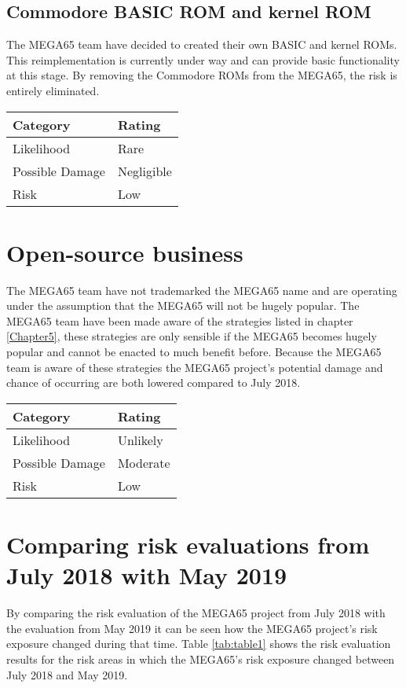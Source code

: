 \subsection{Commodore BASIC ROM and kernel ROM}
The MEGA65 team have decided to created their own BASIC and kernel ROMs. This reimplementation is currently under way and can provide basic functionality at this stage. By removing the Commodore ROMs from the MEGA65, the risk is entirely eliminated. \\

\begin{tabular}{l|l} %
    	\textbf{Category} 	&	\textbf{Rating} \\
      \hline
     Likelihood			&	Rare \\
     Possible Damage 	& 	Negligible \\
     Risk 				&	Low		\\	
    \end{tabular}


\section{Open-source business}
The MEGA65 team have not trademarked the MEGA65 name and are operating under the assumption that the MEGA65 will not be hugely popular. The MEGA65 team have been made aware of the strategies listed in chapter \ref{Chapter5}, these strategies are only sensible if the MEGA65 becomes hugely popular and cannot be enacted to much benefit before. Because the MEGA65 team is aware of these strategies the MEGA65 project's potential damage and chance of occurring are both lowered compared to July 2018. 

\begin{tabular}{l|l} %
    	\textbf{Category} 	&	\textbf{Rating} \\
      \hline
     Likelihood			&	Unlikely \\
     Possible Damage 	& 	Moderate \\
     Risk 				&	Low		\\	
    \end{tabular}


\section{Comparing risk evaluations from July 2018 with May 2019}
\label{comparing risk evaluations}
By comparing the risk evaluation of the MEGA65 project from July 2018 with the evaluation from May 2019 it can be seen how the MEGA65 project's risk exposure changed during that time. Table \ref{tab:table1} shows the risk evaluation results for the risk areas in which the MEGA65's risk exposure changed between July 2018 and May 2019.

